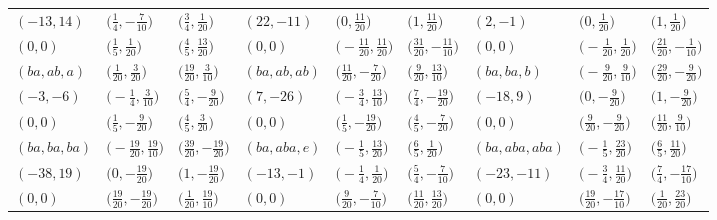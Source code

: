 \documentclass[10pt,a4paper]{amsart}
\theoremstyle{definition}
\numberwithin{equation}{section}
\begin{document}
\begin{landscape}
\begin{table}[th]
\begin{tabular}{|lll|lll|lll|}
\\
$(-13, 14)$ & $\bigl(\frac{1}{4}, -\frac{7}{10}\bigr)$ & $\bigl(\frac{3}{4}, \frac{1}{20}\bigr)$ & $(22, -11)$ & $\bigl(0, \frac{11}{20}\bigr)$ & $\bigl(1, \frac{11}{20}\bigr)$ & $(2, -1)$ & $\bigl(0, \frac{1}{20}\bigr)$ & $\bigl(1, \frac{1}{20}\bigr)$
\\
$(0, 0)$ & $\bigl(\frac{1}{5}, \frac{1}{20}\bigr)$ & $\bigl(\frac{4}{5}, \frac{13}{20}\bigr)$ & $(0, 0)$ & $\bigl(-\frac{11}{20}, \frac{11}{20}\bigr)$ & $\bigl(\frac{31}{20}, -\frac{11}{10}\bigr)$ & $(0, 0)$ & $\bigl(-\frac{1}{20}, \frac{1}{20}\bigr)$ & $\bigl(\frac{21}{20}, -\frac{1}{10}\bigr)$
\\\hline
$(ba, ab, a)$ & $\bigl(\frac{1}{20}, \frac{3}{20}\bigr)$ & $\bigl(\frac{19}{20}, \frac{3}{10}\bigr)$ & $(ba, ab, ab)$ & $\bigl(\frac{11}{20}, -\frac{7}{20}\bigr)$ & $\bigl(\frac{9}{20}, \frac{13}{10}\bigr)$ & $(ba, ba, b)$ & $\bigl(-\frac{9}{20}, \frac{9}{10}\bigr)$ & $\bigl(\frac{29}{20}, -\frac{9}{20}\bigr)$
\\
$(-3, -6)$ & $\bigl(-\frac{1}{4}, \frac{3}{10}\bigr)$ & $\bigl(\frac{5}{4}, -\frac{9}{20}\bigr)$ & $(7, -26)$ & $\bigl(-\frac{3}{4}, \frac{13}{10}\bigr)$ & $\bigl(\frac{7}{4}, -\frac{19}{20}\bigr)$ & $(-18, 9)$ & $\bigl(0, -\frac{9}{20}\bigr)$ & $\bigl(1, -\frac{9}{20}\bigr)$
\\
$(0, 0)$ & $\bigl(\frac{1}{5}, -\frac{9}{20}\bigr)$ & $\bigl(\frac{4}{5}, \frac{3}{20}\bigr)$ & $(0, 0)$ & $\bigl(\frac{1}{5}, -\frac{19}{20}\bigr)$ & $\bigl(\frac{4}{5}, -\frac{7}{20}\bigr)$ & $(0, 0)$ & $\bigl(\frac{9}{20}, -\frac{9}{20}\bigr)$ & $\bigl(\frac{11}{20}, \frac{9}{10}\bigr)$
\\\hline
$(ba, ba, ba)$ & $\bigl(-\frac{19}{20}, \frac{19}{10}\bigr)$ & $\bigl(\frac{39}{20}, -\frac{19}{20}\bigr)$ & $(ba, aba, e)$ & $\bigl(-\frac{1}{5}, \frac{13}{20}\bigr)$ & $\bigl(\frac{6}{5}, \frac{1}{20}\bigr)$ & $(ba, aba, aba)$ & $\bigl(-\frac{1}{5}, \frac{23}{20}\bigr)$ & $\bigl(\frac{6}{5}, \frac{11}{20}\bigr)$
\\
$(-38, 19)$ & $\bigl(0, -\frac{19}{20}\bigr)$ & $\bigl(1, -\frac{19}{20}\bigr)$ & $(-13, -1)$ & $\bigl(-\frac{1}{4}, \frac{1}{20}\bigr)$ & $\bigl(\frac{5}{4}, -\frac{7}{10}\bigr)$ & $(-23, -11)$ & $\bigl(-\frac{3}{4}, \frac{11}{20}\bigr)$ & $\bigl(\frac{7}{4}, -\frac{17}{10}\bigr)$
\\
$(0, 0)$ & $\bigl(\frac{19}{20}, -\frac{19}{20}\bigr)$ & $\bigl(\frac{1}{20}, \frac{19}{10}\bigr)$ & $(0, 0)$ & $\bigl(\frac{9}{20}, -\frac{7}{10}\bigr)$ & $\bigl(\frac{11}{20}, \frac{13}{20}\bigr)$ & $(0, 0)$ & $\bigl(\frac{19}{20}, -\frac{17}{10}\bigr)$ & $\bigl(\frac{1}{20}, \frac{23}{20}\bigr)$

\end{tabular}
\end{table}
\end{landscape}
\end{document}
